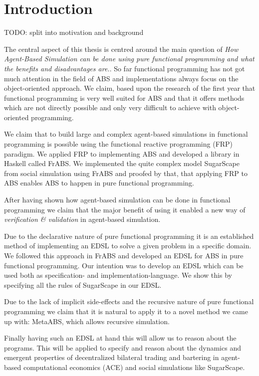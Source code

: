 \chapter{Introduction}
\label{chap:intro}

TODO: split into motivation and background

The central aspect of this thesis is centred around the main question of \textit{How Agent-Based Simulation can be done using pure functional programming and what the benefits and disadvantages are.}. So far functional programming has not got much attention in the field of ABS and implementations always focus on the object-oriented approach. We claim, based upon the research of the first year that functional programming is very well suited for ABS and that it offers methods which are not directly possible and only very difficult to achieve with object-oriented programming.

We claim that to build large and complex agent-based simulations in functional programming is possible using the functional reactive programming (FRP) paradigm. We applied FRP to implementing ABS and developed a library in Haskell called FrABS. We implemented the quite complex model SugarScape from social simulation using FrABS and proofed by that, that applying FRP to ABS enables ABS to happen in pure functional programming.

After having shown how agent-based simulation can be done in functional programming we claim that the major benefit of using it enabled a new way of \textit{verification \& validation} in agent-based simulation. 

Due to the declarative nature of pure functional programming it is an established method of implementing an EDSL to solve a given problem in a specific domain. We followed this approach in FrABS and developed an EDSL for ABS in pure functional programming. Our intention was to develop an EDSL which can be used both as specification- and implementation-language. We show this by specifying all the rules of SugarScape in our EDSL.

Due to the lack of implicit side-effects and the recursive nature of pure functional programming we claim that it is natural to apply it to a novel method we came up with: MetaABS, which allows recursive simulation.

Finally having such an EDSL at hand this will allow us to reason about the programs. This will be applied to specify and reason about the dynamics and emergent properties of decentralized bilateral trading and bartering in agent-based computational economics (ACE) and social simulations like SugarScape.

